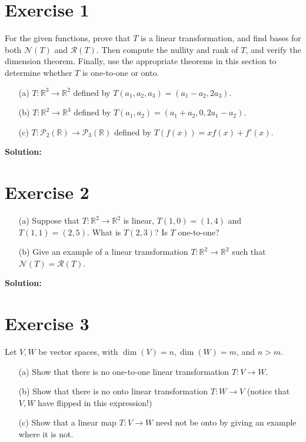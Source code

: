 \documentclass{article}
\begin{document}
\section*{Exercise 1}
For the given functions, prove that $T$ is a linear transformation, and find bases for both $\mathcal{N}(T)$ and $\mathcal{R}(T)$. Then compute the nullity and rank of $T$, and verify the dimension theorem. Finally, use the appropriate theorems in this section to determine whether $T$ is one-to-one or onto.
\begin{itemize}
    \item[(a)] $T : \mathbb{R}^3 \to \mathbb{R}^2$ defined by $T(a_1, a_2, a_3) = (a_1 - a_2, 2a_3)$.

    \item[(b)] $T : \mathbb{R}^2 \to \mathbb{R}^3$ defined by $T(a_1, a_2) = (a_1 + a_2, 0, 2a_1 - a_2)$.

    \item[(c)] $T : \mathcal{P}_2(\mathbb{R}) \to \mathcal{P}_3(\mathbb{R})$ defined by $T(f(x)) = xf(x) + f'(x)$.
\end{itemize}

\textbf{Solution: }\\



\newpage

\section*{Exercise 2}
\begin{itemize}
    \item[(a)] Suppose that $T : \mathbb{R}^2 \to \mathbb{R}^2$ is linear, $T(1,0) = (1,4)$ and $T(1,1) = (2,5)$. What is $T(2,3)$? Is $T$ one-to-one?

    \item[(b)] Give an example of a linear transformation $T : \mathbb{R}^2 \to \mathbb{R}^2$ such that $\mathcal{N}(T) = \mathcal{R}(T)$.
\end{itemize}

\textbf{Solution: }\\



\newpage

\section*{Exercise 3}
Let $V,W$ be vector spaces, with $\dim(V) = n, \dim(W) = m$, and $n > m$.

\begin{itemize}
    \item[(a)] Show that there is no one-to-one linear transformation $T : V \to W$.

    \item[(b)] Show that there is no onto linear transformation $T : W \to V$ (notice that $V,W$ have flipped in this expression!)

    \item[(c)] Show that a linear map $T : V \to W$ need not be onto by giving an example where it is not.
\end{itemize}
\end{document}

